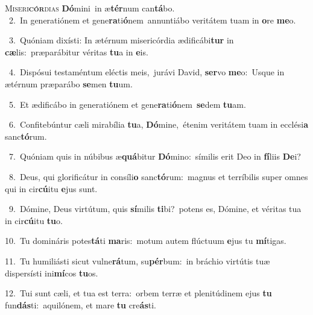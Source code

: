 \lettrine{\initial\textcolor{\initialcolor}{M}}{iseri\-\textbf{cór}\-dias} \textbf{Dó}\-mini~\star in æ\-\textbf{tér}\-num can\-\textbf{tá}\-bo.\\
{\numbfont\textcolor{\numbcolor}{~2.}}~In generatiónem et gene\-\textbf{ra}\-ti\-\textbf{ó}\-nem~\star annuntiábo veritátem tuam in \textbf{o}\-re \textbf{me}\-o.\par
{\numbfont\textcolor{\numbcolor}{~3.}}~Quóniam dixísti: In ætérnum misericórdia ædificábi\textbf{tur} in \textbf{cæ}\-lis:~\star præparábitur véritas \textbf{tu}\-a in \textbf{e}\-is.\par
{\numbfont\textcolor{\numbcolor}{~4.}}~Dispósui testaméntum eléctis meis,~\dagger jurávi David, \textbf{ser}\-vo \textbf{me}\-o:~\star Usque in ætérnum præparábo \textbf{se}\-men \textbf{tu}\-um.\par
{\numbfont\textcolor{\numbcolor}{~5.}}~Et ædificábo in generatiónem et gene\-\textbf{ra}\-ti\-\textbf{ó}\-nem~\star \textbf{se}\-dem \textbf{tu}\-am.\par
{\numbfont\textcolor{\numbcolor}{~6.}}~Confitebúntur cæli mirabília \textbf{tu}\-a, \textbf{Dó}\-mine,~\star étenim veritátem tuam in ecclési\textbf{a} sanc\-\textbf{tó}\-rum.\par
{\numbfont\textcolor{\numbcolor}{~7.}}~Quóniam quis in núbibus æ\-\textbf{quá}\-bitur \textbf{Dó}\-mino:~\star símilis erit Deo in \textbf{fí}\-liis \textbf{De}\-i?\par
{\numbfont\textcolor{\numbcolor}{~8.}}~Deus, qui glorificátur in consíli\textbf{o} sanc\-\textbf{tó}\-rum:~\star magnus et terríbilis super omnes qui in cir\-\textbf{cú}\-itu \textbf{e}\-jus sunt.\par
{\numbfont\textcolor{\numbcolor}{~9.}}~Dómine, Deus virtútum, quis \textbf{sí}\-milis \textbf{ti}\-bi?~\star potens es, Dómine, et véritas tua in cir\-\textbf{cú}\-itu \textbf{tu}\-o.\par
{\numbfont\textcolor{\numbcolor}{10.}}~Tu domináris potes\-\textbf{tá}\-ti \textbf{ma}\-ris:~\star motum autem flúctuum \textbf{e}\-jus tu \textbf{mí}\-tigas.\par
{\numbfont\textcolor{\numbcolor}{11.}}~Tu humiliásti sicut vulne\-\textbf{rá}\-tum, su\-\textbf{pér}\-bum:~\star in bráchio virtútis tuæ dispersísti ini\-\textbf{mí}\-cos \textbf{tu}\-os.\par
{\numbfont\textcolor{\numbcolor}{12.}}~Tui sunt cæli, et tua est terra:~\dagger orbem terræ et plenitúdinem ejus \textbf{tu} fun\-\textbf{dás}\-ti:~\star aquilónem, et mare \textbf{tu} cre\-\textbf{ás}\-ti.\par
